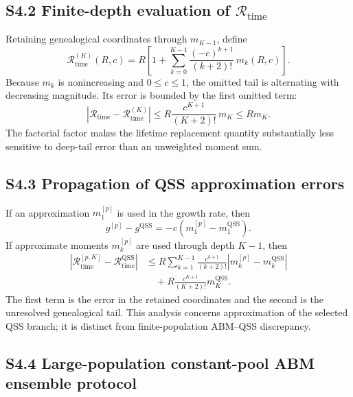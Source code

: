\documentclass[11pt]{article}
\begin{document}
\subsection*{S4.2 Finite-depth evaluation of $\mathcal R_{\mathrm{time}}$}

Retaining genealogical coordinates through $m_{K-1}$, define
\begin{equation}
\mathcal R_{\mathrm{time}}^{(K)}(R,c)
=R\left[
1+\sum_{k=0}^{K-1}\frac{(-c)^{k+1}}{(k+2)!}\,m_k(R,c)
\right].
\label{eq:S8-Rtime-K}
\end{equation}
Because $m_k$ is nonincreasing and $0\leq c\leq1$, the omitted tail is alternating with decreasing magnitude. Its error is bounded by the first omitted term:
\begin{equation}
\left|
\mathcal R_{\mathrm{time}}-
\mathcal R_{\mathrm{time}}^{(K)}
\right|
\leq
R\frac{c^{K+1}}{(K+2)!}\,m_K
\leq Rm_K.
\label{eq:S8-Rtime-tail}
\end{equation}
The factorial factor makes the lifetime replacement quantity substantially less sensitive to deep-tail error than an unweighted moment sum.

\subsection*{S4.3 Propagation of QSS approximation errors}

If an approximation $m_1^{[p]}$ is used in the growth rate, then
\begin{equation}
g^{[p]}-g^{\mathrm{QSS}}
=-c\left(m_1^{[p]}-m_1^{\mathrm{QSS}}\right).
\label{eq:S8-growth-error}
\end{equation}
If approximate moments $m_k^{[p]}$ are used through depth $K-1$, then
\begin{align}
\left|
\mathcal R_{\mathrm{time}}^{[p,K]}
-
\mathcal R_{\mathrm{time}}^{\mathrm{QSS}}
\right|
&\leq
R\sum_{k=1}^{K-1}
\frac{c^{k+1}}{(k+2)!}
\left|m_k^{[p]}-m_k^{\mathrm{QSS}}\right| \\
&\quad+
R\frac{c^{K+1}}{(K+2)!}m_K^{\mathrm{QSS}}.
\label{eq:S8-Rtime-error}
\end{align}
The first term is the error in the retained coordinates and the second is the unresolved genealogical tail. This analysis concerns approximation of the selected QSS branch; it is distinct from finite-population ABM--QSS discrepancy.

\subsection*{S4.4 Large-population constant-pool ABM ensemble protocol}
\end{document}
